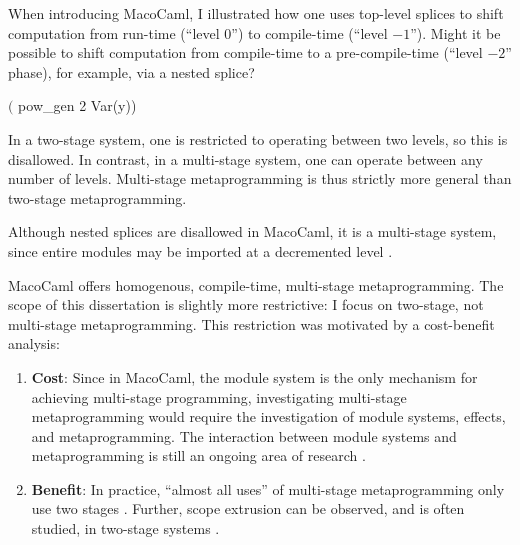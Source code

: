 \begin{enumerate}
  When introducing MacoCaml, I illustrated how one uses top-level splices to shift computation from run-time (``level $0$'') to compile-time (``level $-1$''). Might it be possible to shift computation from compile-time to a pre-compile-time (``level $-2$'' phase), for example, via a nested splice?
  \begin{macocaml}
$($ pow_gen 2 Var(y))
  \end{macocaml}
  In a two-stage system, one is restricted to operating between two levels, so this is disallowed. In contrast, in a multi-stage system, one can operate between any number of levels. Multi-stage metaprogramming is thus strictly more general than two-stage metaprogramming.
  
  Although nested splices are disallowed in MacoCaml, it is a multi-stage system, since entire modules may be imported at a decremented level \citep{xie-2023}. 
\end{enumerate}
  
MacoCaml offers homogenous, compile-time, multi-stage metaprogramming. The scope of this dissertation is slightly more restrictive: I focus on two-stage, not multi-stage metaprogramming. This restriction was motivated by a cost-benefit analysis:
\begin{enumerate}
  \item \textbf{Cost}: Since in MacoCaml, the module system is the only mechanism for achieving multi-stage programming, investigating multi-stage metaprogramming would require the investigation of module systems, effects, and metaprogramming. The interaction between module systems and metaprogramming is still an ongoing area of research \citep{chiang-2024}.
  \item \textbf{Benefit}: In practice, ``almost all uses'' of multi-stage metaprogramming only use two stages \citep{inoue-2012}. Further, scope extrusion can be observed, and is often studied, in two-stage systems \citep{isoda-24,kiselyov-16}.
\end{enumerate}